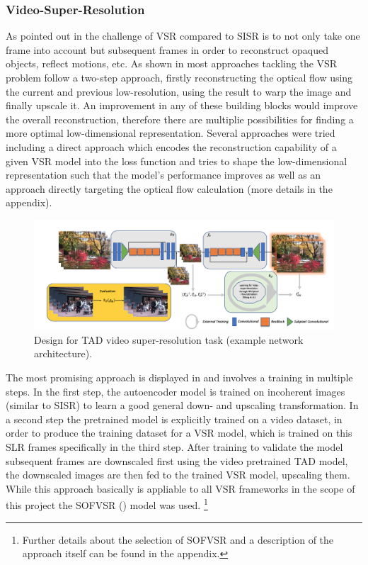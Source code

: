 \subsubsection*{Video-Super-Resolution}
As pointed out in  the challenge of \ac{VSR}
compared to \ac{SISR} is to not only take one frame into account but subsequent
frames in order to reconstruct opaqued objects, reflect motions, etc.
As shown in  most approaches tackling the
\ac{VSR} problem follow a two-step approach, firstly reconstructing the optical
flow using the current and previous low-resolution, using the result to warp
the image and finally upscale it. An improvement in any of these building blocks
would improve the overall reconstruction, therefore there are multiplie
possibilities for finding a more optimal low-dimensional representation. Several
approaches were tried including a direct approach which encodes the
reconstruction capability of a given \ac{VSR} model into the loss function and
tries to shape the low-dimensional representation such that the model's
performance improves as well as an approach directly targeting the optical
flow calculation (more details in the appendix).

\begin{figure}[!htbp]
	\centering
	\includegraphics[width=14cm]{figures/architecture_video_external}
	\caption{Design for \ac{TAD} video super-resolution task (example network
  architecture).}
  \label{fig:architecture_video}
\end{figure}

The most promising approach is displayed in 
and involves a training in multiple steps. In the first step, the autoencoder
model is trained on incoherent images (similar to \ac{SISR}) to learn a good
general down- and upscaling transformation. In a second step the pretrained
model is explicitly trained on a video dataset, in order to produce the
training dataset for a \ac{VSR} model, which is trained on this SLR frames
specifically in the third step. After training to validate the model subsequent
frames are downscaled first using the video pretrained \ac{TAD} model, the
downscaled images are then fed to the trained \ac{VSR} model, upscaling them.
While this approach basically is appliable to all \ac{VSR} frameworks in the
scope of this project the SOFVSR (\cite{SOFVSR}) model was used.
\footnote{Further details about the selection of SOFVSR and a description of
the approach itself can be found in the appendix.}

